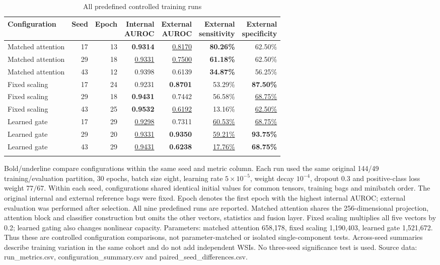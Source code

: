 \clearpage
\begin{table}[H]\centering
\caption{All predefined controlled training runs}\label{tab:S15}
\small
\begin{tabular}{lrrrrrr}
\toprule
Configuration & Seed & Epoch & \shortstack{Internal\\AUROC} & \shortstack{External\\AUROC} & \shortstack{External\\sensitivity} & \shortstack{External\\specificity} \\
\midrule
Matched attention & 17 & 13 & \textbf{0.9314} & \underline{0.8170} & \textbf{80.26\%} & 62.50\% \\
Matched attention & 29 & 18 & \underline{0.9331} & \underline{0.7500} & \textbf{61.18\%} & 62.50\% \\
Matched attention & 43 & 12 & 0.9398 & 0.6139 & \textbf{34.87\%} & 56.25\% \\
\addlinespace
Fixed scaling & 17 & 24 & 0.9231 & \textbf{0.8701} & 53.29\% & \textbf{87.50\%} \\
Fixed scaling & 29 & 18 & \textbf{0.9431} & 0.7442 & 56.58\% & \underline{68.75\%} \\
Fixed scaling & 43 & 25 & \textbf{0.9532} & \underline{0.6192} & 13.16\% & \underline{62.50\%} \\
\addlinespace
Learned gate & 17 & 29 & \underline{0.9298} & 0.7311 & \underline{60.53\%} & \underline{68.75\%} \\
Learned gate & 29 & 20 & \underline{0.9331} & \textbf{0.9350} & \underline{59.21\%} & \textbf{93.75\%} \\
Learned gate & 43 & 29 & \underline{0.9431} & \textbf{0.6238} & \underline{17.76\%} & \textbf{68.75\%} \\
\addlinespace
\bottomrule
\end{tabular}
\par\medskip\raggedright\footnotesize Bold/underline compare configurations within the same seed and metric column. Each run used the same original 144/49 training/evaluation partition, 30 epochs, batch size eight, learning rate $5\times10^{-5}$, weight decay $10^{-4}$, dropout 0.3 and positive-class loss weight $77/67$. Within each seed, configurations shared identical initial values for common tensors, training bags and minibatch order. The original internal and external reference bags were fixed. Epoch denotes the first epoch with the highest internal AUROC; external evaluation was performed after selection. All nine predefined runs are reported. Matched attention shares the 256-dimensional projection, attention block and classifier construction but omits the other vectors, statistics and fusion layer. Fixed scaling multiplies all five vectors by 0.2; learned gating also changes nonlinear capacity. Parameters: matched attention 658,178, fixed scaling 1,190,403, learned gate 1,521,672. Thus these are controlled configuration comparisons, not parameter-matched or isolated single-component tests. Across-seed summaries describe training variation in the same cohort and do not add independent WSIs. No three-seed significance test is used. Source data: run\_metrics.csv, configuration\_summary.csv and paired\_seed\_differences.csv.

\end{table}
